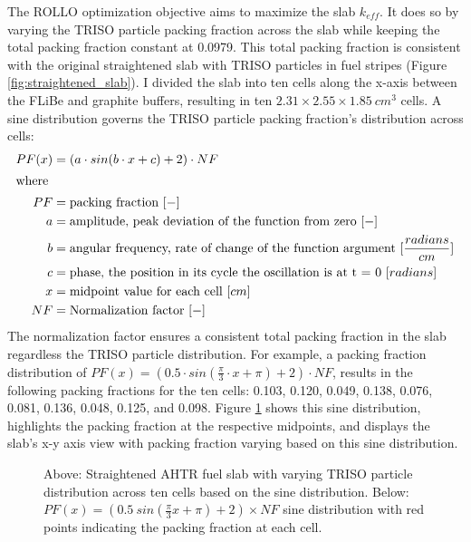The \gls{ROLLO} optimization objective aims to maximize the slab $k_{eff}$. 
It does so by varying the \gls{TRISO} particle packing fraction across the slab
while keeping the total packing fraction constant at 0.0979. 
This total packing fraction is consistent with the original straightened slab with 
TRISO particles in fuel stripes (Figure \ref{fig:straightened_slab}). 
I divided the slab into ten cells along the x-axis between the \gls{FLiBe} and 
graphite buffers, resulting in ten $2.31 \times 2.55 \times 1.85\ cm^3$ cells. 
A sine distribution governs the \gls{TRISO} particle packing fraction's 
distribution across cells:
\begin{align}
    PF(x) &= \left(a\cdot sin(b\cdot x + c) + 2\right) \cdot NF\\
    \intertext{where}
    PF &= \mbox{packing fraction } [-] \nonumber \\ 
    a &= \mbox{amplitude, peak deviation of the function from zero } [-] \nonumber \\
    b &= \mbox{angular frequency, rate of change of the function argument } [\frac{radians}{cm}] \nonumber \\
    c &= \mbox{phase, the position in its cycle the oscillation is at t = 0 } [radians]\nonumber \\
    x &= \mbox{midpoint value for each cell } [cm]\nonumber \\
    NF &= \mbox{Normalization factor } [-]\nonumber
\end{align}
The normalization factor ensures a consistent total packing fraction 
in the slab regardless the \gls{TRISO} particle distribution.
For example, a packing fraction distribution of 
$PF(x) = \left(0.5\cdot sin(\frac{\pi}{3}\cdot x + \pi) + 2\right)  \cdot NF$, 
results in the following packing fractions for the ten cells: 0.103, 0.120, 
0.049, 0.138, 0.076, 0.081, 0.136, 0.048, 0.125, and 0.098. 
Figure \ref{fig:triso_distribution} shows this sine distribution, highlights 
the packing fraction at the respective midpoints, and displays the slab's x-y 
axis view with packing fraction varying based on this sine distribution. 
\begin{figure}[]
    \centering
    \caption{Above: Straightened \acrfull{AHTR} fuel slab with varying \gls{TRISO} particle 
    distribution across ten cells based on the sine distribution. 
    Below: $PF(x) = (0.5\ sin(\frac{\pi}{3}x + \pi) + 2)  \times NF$ 
    sine distribution with red points indicating the packing fraction at each cell. }
    \label{fig:triso_distribution}
\end{figure}

